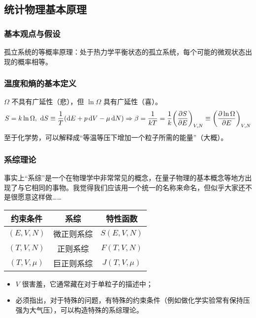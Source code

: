 \subsection{统计物理基本原理}

\subsubsection{基本观点与假设}

孤立系统的等概率原理：处于热力学平衡状态的孤立系统，每个可能的微观状态出现的概率相等。

\subsubsection{温度和熵的基本定义}

$\Omega$ 不具有广延性（悲），但 $\ln{\Omega}$ 具有广延性（喜）。
\[
    S = k \ln{\Omega},\ \dd{S} \equiv \frac{1}{T} \qty(\dd{E} + p \dd{V} - \mu \dd{N}) \Rightarrow \beta = \frac{1}{k T} = \frac{1}{k} \qty(\pdv{S}{E})_{V, N} \equiv \qty(\pdv{\ln{\Omega}}{E})_{V, N}
\]
至于化学势，可以解释成“等温等压下增加一个粒子所需的能量”（大概）。

\subsubsection{系综理论}

事实上“系综”是一个在物理学中非常常见的概念，在量子物理的基本概念等地方出现了与它相同的事物。我觉得我们应该用一个统一的名称来命名，但似乎大家还不是很愿意这样做……

\begin{table}[H]
    \centering
    \begin{tabular}{|c|c|c|}
        \hline
        约束条件          & 系综    & 特性函数           \\
        \hline
        $(E, V, N)$   & 微正则系综 & $S(E, V, N)$   \\
        \hline
        $(T, V, N)$   & 正则系综  & $F(T, V, N)$   \\
        \hline
        $(T, V, \mu)$ & 巨正则系综 & $J(T, V, \mu)$ \\
        \hline
    \end{tabular}
\end{table}

\begin{itemize}
    \item $V$ 很害羞，它通常藏在对于单粒子的描述中；
    \item 必须指出，对于特殊的问题，有特殊的约束条件（例如做化学实验常有保持压强为大气压），可以构造特殊的系综理论。
\end{itemize}

